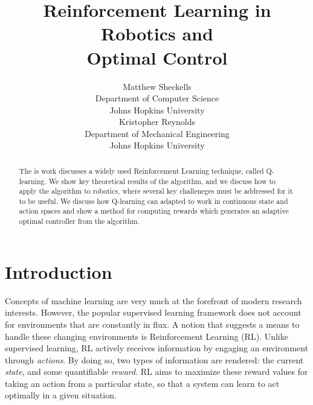 \documentclass{article} %
\title{Reinforcement Learning in Robotics and  \\ Optimal Control}%
\author{
Matthew Sheckells\\
Department of Computer Science\\
Johns Hopkins University\\
\And
Kristopher Reynolds \\
Department of Mechanical Engineering\\
Johns Hopkins University\\
}
\begin{document}
\maketitle

\begin{abstract}
The is work discusses a widely used Reinforcement Learning technique, called Q-learning.  We show key theoretical results of the algorithm, and we discuss how to apply the algorithm to robotics, where several key challeneges must be addressed for it to be useful.  We discuss how Q-learning can adapted to work in continuous state and action spaces and show a method for computing rewards which generates an adaptive optimal controller from the algorithm.  
\end{abstract}

\section{Introduction}
Concepts of machine learning are very much at the forefront of modern research interests. However, the popular supervised learning framework does not account for environments that are constantly in flux. A notion that suggests a means to handle these changing environments is Reinforcement Learning (RL). Unlike supervised learning, RL actively receives information by engaging an environment through \textit{actions}. By doing so, two types of information are rendered: the current \textit{state}, and some quantifiable \textit{reward}. RL aims to maximize these reward values for taking an action from a particular state, so that a system can learn to act optimally in a given situation.
\end{document}
